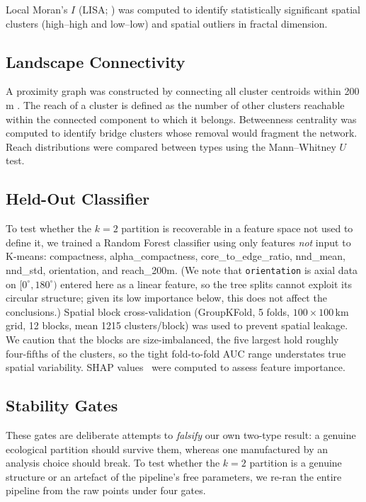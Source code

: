 \documentclass[twocolumn]{article}
\begin{document}
Local Moran's $I$ (LISA; \citealt{anselin1995local}) was computed to identify
statistically significant spatial clusters (high--high and low--low) and spatial
outliers in fractal dimension.

\subsection{Landscape Connectivity}
\label{sec:connectivity}

A proximity graph was constructed by connecting all cluster centroids within 200\,m
\citep{urban2001landscape}. The reach of a cluster is defined as the number of other
clusters reachable within the connected component to which it belongs. Betweenness
centrality was computed to identify bridge clusters whose removal would fragment the
network. Reach distributions were compared between types using the Mann--Whitney $U$ test.

\subsection{Held-Out Classifier}
\label{sec:classifier}

To test whether the $k=2$ partition is recoverable in a feature space not used to define it,
we trained a Random Forest classifier using only features \textit{not} input to K-means:
compactness, alpha\_compactness, core\_to\_edge\_ratio, nnd\_mean, nnd\_std,
orientation, and reach\_200m. (We note that \texttt{orientation} is axial data on
$[0^\circ,180^\circ)$ entered here as a linear feature, so the tree splits cannot exploit its
circular structure; given its low importance below, this does not affect the conclusions.)
Spatial block cross-validation (GroupKFold, 5 folds,
$100 \times 100$\,km grid, 12 blocks, mean 1215 clusters/block) was used to prevent
spatial leakage. We caution that the blocks are size-imbalanced, the five largest hold roughly
four-fifths of the clusters, so the tight fold-to-fold AUC range understates true spatial
variability. SHAP values~\citep{lundberg2017unified} were computed to assess feature importance.

\subsection{Stability Gates}
\label{sec:sensitivity}

These gates are deliberate attempts to \emph{falsify} our own two-type result: a genuine ecological
partition should survive them, whereas one manufactured by an analysis choice should break. To test
whether the $k=2$ partition is a genuine structure or an artefact of the pipeline's free parameters,
we re-ran the entire pipeline from the raw points under four gates.
\end{document}
